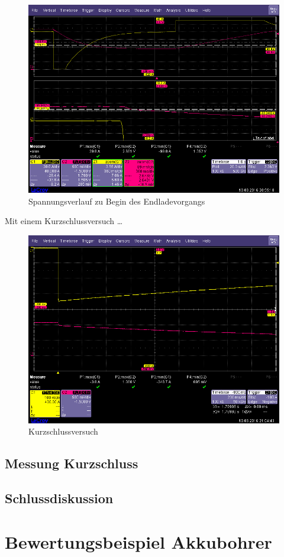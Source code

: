 \documentclass[a4,paper,fleqn]{article}
\begin{document}
\begin{figure}[h!]
    \centering
    \includegraphics[width=1.0\textwidth, trim=0 20 0 45, clip=true]{fig/discharge1.png}
    \caption{Spannungsverlauf zu Begin des Endladevorgangs}
    \label{fig:discharge_u}
\end{figure}

\noindent
Mit einem Kurzschlussversuch \ldots

\begin{figure}[h!]
    \centering
    \includegraphics[width=1.0\textwidth, trim=0 20 0 45, clip=true]{fig/short.png}
    \caption{Kurzschlussversuch}
    \label{fig:short}
\end{figure}

\subsection{Messung Kurzschluss}
\subsection{Schlussdiskussion}

\section{Bewertungsbeispiel Akkubohrer}
\end{document}
